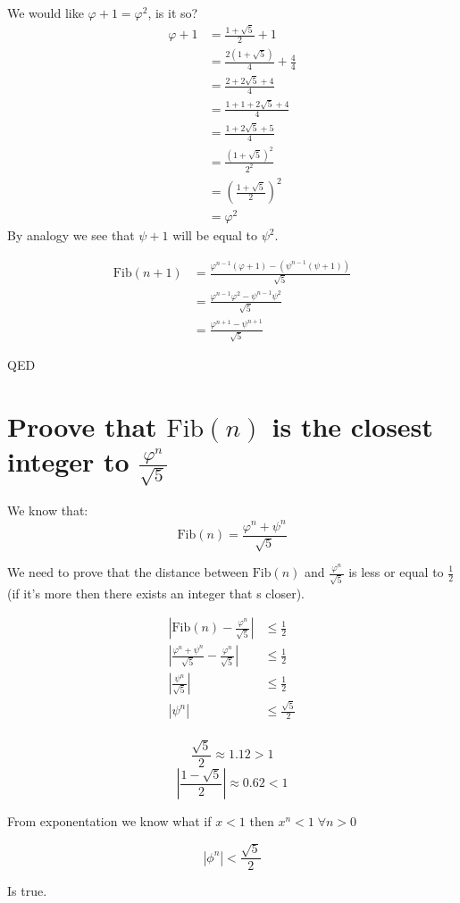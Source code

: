 \documentclass{article}
\newcommand{\Fib}[1][]{\ensuremath{\text{Fib}(#1)}}
\newcommand{\s}{\sqrt{5}}
\begin{document}
We would like $\varphi + 1 = \varphi^2$, is it so?
\[
	\begin{aligned}
	  \varphi + 1 &= \frac{1 + \s}{2} + 1\\
	  &= \frac{2 (1 + \s)}{4} + \frac{4}{4}\\
	  &= \frac{2 + 2\s + 4}{4} \\
	  &= \frac{1 + 1 + 2\s + 4}{4} \\
	  &= \frac{1 + 2\s + 5}{4} \\
	  &= \frac{(1 + \s)^2}{2^2} \\
	  &= \left(\frac{1 + \s}{2} \right)^2 \\
	  &= \varphi^2
   \end{aligned}
\]
By analogy we see that $\psi + 1$ will be equal to $\psi^2$.

\[
\begin{aligned}
	  \Fib[n + 1] &= \frac{\varphi^{n-1} (\varphi + 1) - (\psi^{n -1} (\psi + 1))}{\s} \\
		&= \frac{\varphi^{n-1} \varphi^2 - \psi^{n -1} \psi^2}{\s} \\
		&= \frac{\varphi^{n+1} - \psi^{n + 1}}{\s} 
\end{aligned}
\]

QED

\section{Proove that $\Fib[n]$ is the closest integer to $\frac{\varphi^n}{\s}$}

We know that:
\[
	\Fib[n] = \frac{\varphi^n + \psi^n}{\s}
\]

We need to prove that the distance between $\Fib[n]$ and $\frac{\varphi^n}{\s}$
is less or equal to $\frac{1}{2}$ (if it's more then there exists an integer that
s closer).

\[
	\begin{aligned}
		\left | \Fib[n] - \frac{\varphi^n}{\s} \right| & \le \frac{1}{2} \\
		\left | \frac{\varphi^n + \psi^n}{\s}  - \frac{\varphi^n}{\s} \right| & \le \frac{1}{2} \\
		\left | \frac{ \psi^n}{\s} \right| & \le \frac{1}{2} \\
		\left | \psi^n \right| & \le \frac{\s}{2} \\
	\end{aligned}
\]

\[
	\frac{\sqrt{5}}{2} \approx 1.12 > 1
\]
\[
   \left | \frac{1 - \s}{2} \right| \approx 0.62 < 1
\]

From exponentation we know what if $x < 1$ then $x^n < 1 \; \forall n > 0$

\[
   \left | \phi^n \right| < \frac{\sqrt{5}}{2}
\]

Is true.

\end{document}
